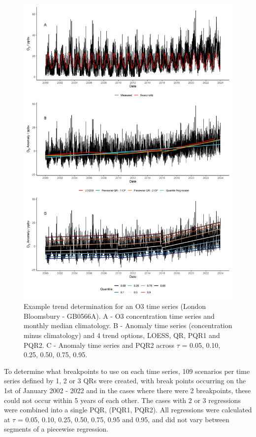 \documentclass[journal abbreviation, manuscript]{copernicus}
\begin{document}
\begin{figure}[t]
\includegraphics[width=12cm]{plots/method.png}
\caption{Example trend determination for an O3 time series (London Bloomsbury - GB0566A). A - O3 concentration time series and monthly median climatology. B - Anomaly time series (concentration minus climatology) and 4 trend options, LOESS, QR, PQR1 and PQR2. C - Anomaly time series and PQR2 across $\tau$ = 0.05, 0.10, 0.25, 0.50, 0.75, 0.95.}
\label{method_plot}
\end{figure}

To determine what breakpoints to use on each time series, 109 scenarios per time series defined by 1, 2 or 3 QRs were created, with break points occurring on the 1st of January 2002 - 2022 and in the cases where there were 2 breakpoints, these could not occur within 5 years of each other. The cases with 2 or 3 regressions were combined into a single PQR, (PQR1, PQR2). All regressions were calculated at $\tau$ = 0.05, 0.10, 0.25, 0.50, 0.75, 0.95 and 0.95, and did not vary between segments of a piecewise regression.
\end{document}
